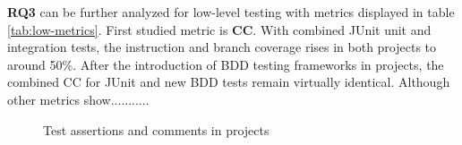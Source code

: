 \textbf{RQ3} can be further analyzed for low-level testing with metrics displayed in table \ref{tab:low-metrics}.
First studied metric is \textbf{CC}. With combined JUnit unit and integration tests, the instruction and branch coverage rises in both projects
to around 50\%. After the introduction of BDD testing frameworks in projects, the combined CC for JUnit and new BDD tests remain
virtually identical. Although other metrics show...........

    \begin{figure}[H]%
        \centering
        \qquad
        \caption{Test assertions and comments in projects}%
        \label{fig:org-perception-two}%
    \end{figure}

